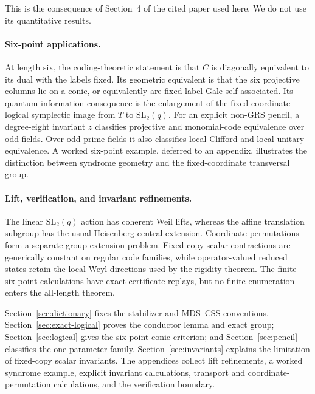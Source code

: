 This is the consequence of Section~4 of the cited paper used here.  We do not
use its quantitative results.

\paragraph{Six-point applications.}
At length six, the coding-theoretic statement is that
\(C\) is diagonally equivalent to its dual with the labels fixed.  Its
geometric equivalent is that the six
projective columns lie on a conic, or equivalently are fixed-label Gale
self-associated.  Its quantum-information consequence is the enlargement of
the fixed-coordinate logical symplectic image from \(T\) to
\(\mathrm{SL}_2(q)\).  For an explicit non-GRS pencil, a degree-eight
invariant \(z\) classifies projective and monomial-code equivalence over odd
fields.  Over odd prime fields it also classifies local-Clifford and
local-unitary equivalence.  A worked six-point example, deferred to an
appendix, illustrates the distinction between syndrome geometry and the
fixed-coordinate transversal group.

\paragraph{Lift, verification, and invariant refinements.}
The linear \(\mathrm{SL}_2(q)\) action has coherent Weil lifts, whereas the
affine translation subgroup has the usual Heisenberg central extension.
Coordinate permutations form a separate group-extension problem.  Fixed-copy
scalar contractions are generically constant on regular code families, while
operator-valued reduced states retain the local Weyl directions used by the
rigidity theorem.  The finite six-point calculations have exact certificate
replays, but no finite enumeration enters the all-length theorem.

Section~\ref{sec:dictionary} fixes the stabilizer and MDS--CSS conventions.
Section~\ref{sec:exact-logical} proves the conductor lemma and exact group;
Section~\ref{sec:logical} gives the six-point conic criterion; and
Section~\ref{sec:pencil} classifies the one-parameter family.
Section~\ref{sec:invariants} explains the limitation of fixed-copy scalar
invariants.  The appendices collect lift refinements, a worked syndrome
example, explicit invariant calculations, transport and coordinate-permutation
calculations, and the verification boundary.
